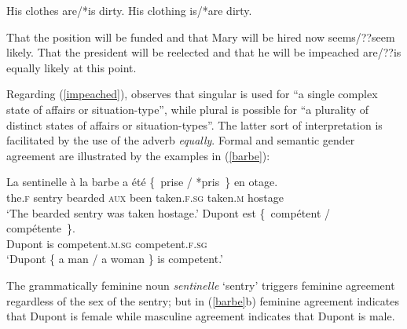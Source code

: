 \documentclass[output=paper
 	        ,biblatex
                ,babelshorthands
                ,newtxmath
                ,draftmode
                ,colorlinks, citecolor=brown
]{langscibook}
\begin{document}
\begin{exe} 
\ex \label{clothes}
 \begin{xlist}
\ex   His clothes are/*is dirty.
\ex   His clothing is/*are dirty.
\end{xlist}
\end{exe}

\begin{exe} 
\ex \label{impeached}
 \begin{xlist}
\ex   That the position will be funded and that Mary will be hired now seems/??seem likely.
\ex  	That the president will be reelected and that he will be impeached are/??is equally likely at this point.
\end{xlist}
\end{exe}

\noindent
Regarding (\ref{impeached}), \citet[564--565]{Mccloskey:1991} observes that singular is used for ``a single complex state of affairs or situation-type'', while plural is possible for ``a plurality of distinct states of affairs or situation-types''.  The latter sort of interpretation is facilitated by the use of the adverb \textit{equally}.   Formal and semantic gender agreement are illustrated by the  examples in (\ref{barbe}):

\begin{exe} 
\ex \label{barbe}
 \begin{xlist}
\ex   
\gll La             sentinelle {\`{a} la barbe} a            \'{e}t\'{e} \{~prise                          /  *pris~\} 	                 {en otage}.  \\
     the.\textsc{f} sentry     bearded          \textsc{aux} been        \hphantom{\{~}taken.\textsc{f.sg} {} \hphantom{*}taken.\textsc{m} hostage \\
\glt `The bearded sentry was taken hostage.’
\ex   
\gll Dupont est	\{~comp\'{e}tent                      /	comp\'{e}tente~\}. \\
     Dupont is	\hphantom{\{~}competent.\textsc{m.sg} {}	competent.\textsc{f.sg}\\
\glt `Dupont \{ a man / a woman \} is competent.’
 \end{xlist}
\end{exe} 

\noindent
The grammatically feminine noun \textit{sentinelle} `sentry'  triggers feminine agreement regardless of the sex of the sentry; but in (\ref{barbe}b) feminine agreement indicates that Dupont is female while masculine agreement indicates that Dupont is male.  
\end{document}
